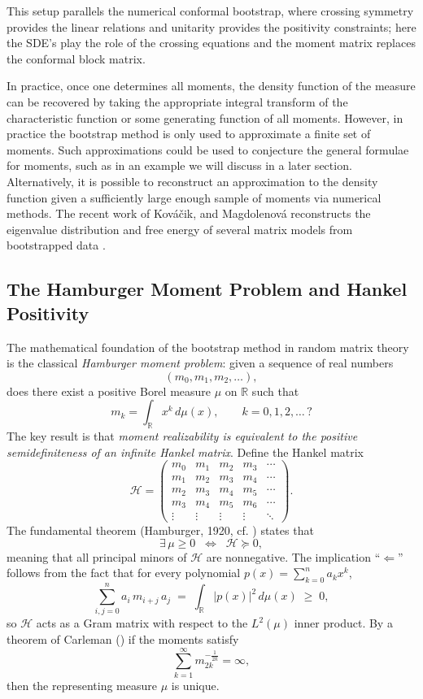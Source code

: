 \documentclass[11pt]{article}
\theoremstyle{plain}
\begin{document}
This setup parallels the numerical conformal bootstrap, where crossing symmetry provides the linear relations
and unitarity provides the positivity constraints; here the SDE's play the role of the crossing equations and
the moment matrix replaces the conformal block matrix.

In practice, once one determines all moments, the density function of the measure can be recovered by taking the appropriate integral transform of the characteristic function or some generating function of all moments. However, in practice the bootstrap method is only used to approximate a finite set of moments. Such approximations could be used to conjecture the general formulae for moments, such as in an example we will discuss in a later section. Alternatively, it is possible to reconstruct an approximation to the density function given a sufficiently large enough sample of moments via numerical methods. The recent work of Kováčik, and Magdolenová reconstructs the eigenvalue distribution and free energy of several matrix models from bootstrapped data \cite{bootstraps reconstruction}.

\subsection{The Hamburger Moment Problem and Hankel Positivity}

The mathematical foundation of the bootstrap method in random matrix theory is the
classical \emph{Hamburger moment problem}: given a sequence of real numbers
\[
(m_0, m_1, m_2, \dots),
\]
does there exist a positive Borel measure $\mu$ on $\mathbb{R}$ such that
\[
m_k = \int_{\mathbb{R}} x^k \, d\mu(x), \qquad k = 0,1,2,\dots \, ?
\]
The key result is that \emph{moment realizability is equivalent to the
positive semidefiniteness of an infinite Hankel matrix}.  Define the Hankel matrix
\[
\mathcal{H} =
\begin{pmatrix}
m_0 & m_1 & m_2 & m_3 & \cdots \\
m_1 & m_2 & m_3 & m_4 & \cdots \\
m_2 & m_3 & m_4 & m_5 & \cdots \\
m_3 & m_4 & m_5 & m_6 & \cdots \\
\vdots & \vdots & \vdots & \vdots & \ddots
\end{pmatrix}.
\]
The fundamental theorem (Hamburger, 1920, cf. \cite{AKHZ})   states that 
\[
\exists\,\mu \ge 0 \;\; \Longleftrightarrow \;\; \mathcal{H} \succeq 0,
\]
meaning that all principal minors of $\mathcal{H}$ are nonnegative.  The implication
``$\Leftarrow$'' follows from the fact that for every polynomial
$p(x) = \sum_{k=0}^n a_k x^k$,
\[
\sum_{i,j=0}^n a_i\, m_{i+j}\, a_j
\;=\;
\int_{\mathbb{R}} |p(x)|^2\, d\mu(x) \;\ge\; 0,
\]
so $\mathcal{H}$ acts as a Gram matrix with respect to the $L^2(\mu)$ inner product.  By a theorem of Carleman (\cite{AKHZ}) if the moments satisfy
\[
\sum_{k=1}^{\infty} m_{2k}^{-\frac{1}{2k}} = \infty,
\]
then the representing measure $\mu$ is unique.
\end{document}
